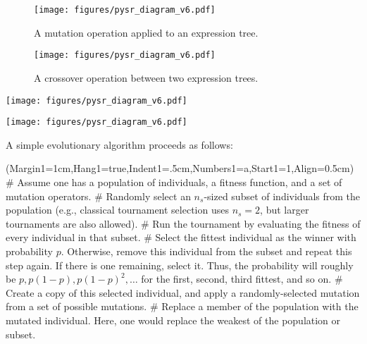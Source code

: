 \documentclass[letterpaper,twocolumn]{scrartcl}
\newcommand\pysr{\textsc{PySR}\xspace}
\begin{document}
\begin{figure}[h!]
    \centering
    \texttt{[image: figures/pysr\_diagram\_v6.pdf]}
    \caption{A mutation operation applied to an expression tree.}
    \label{fig:mutations}
\end{figure}

\begin{figure}[h!]
    \centering
    \texttt{[image: figures/pysr\_diagram\_v6.pdf]}
    \caption{A crossover operation between two expression trees.}
    \label{fig:crossover}
\end{figure}

\begin{figure*}[h!]
    \centering
    \texttt{[image: figures/pysr\_diagram\_v6.pdf]}
    \caption{The inner loop of \pysr. A population of expressions is randomly subsampled. Among this subsample, a tournament is performed, and the winner is selected for breeding: either by mutation, crossover, simplification, or explicit optimization. Examples of mutation and crossover operations are visualized in \cref{fig:mutations,fig:crossover}.}
    \label{fig:evolution_loop}
\end{figure*}

\begin{figure*}[h!]
    \centering
    \texttt{[image: figures/pysr\_diagram\_v6.pdf]}
    \caption{The outer loop of \pysr. Several populations evolve independently according to the algorithm described in \cref{fig:evolution_loop}. At the end of a specified number of rounds of evolution, migration between islands is performed.}
    \label{fig:migration}
\end{figure*}


A simple evolutionary algorithm proceeds as follows:
\begin{easylist}
\ListProperties(Margin1=1cm,Hang1=true,Indent1=.5cm,Numbers1=a,Start1=1,Align=0.5cm)
# Assume one has a population of individuals, a fitness function, and a set of mutation operators.
\label{step:assumptions}
# Randomly select an $n_s$-sized subset of individuals from the population (e.g., classical tournament selection uses $n_s=2$, but larger tournaments are also allowed).
\label{step:sampling}
# Run the tournament by evaluating the fitness of every individual in that subset.
\label{step:prep_tournament}
# Select the fittest individual as the winner with probability $p$. Otherwise, remove this individual from the subset and repeat this step again.
If there is one remaining, select it.
Thus, the probability will roughly be $p, p(1-p), p(1-p)^2, \ldots$ for the first, second, third fittest, and so on. 
\label{step:select}
# Create a copy of this selected individual, and apply a randomly-selected mutation from a set of possible mutations.
\label{step:mutate}
# Replace a member of the population with the mutated individual. Here, one would replace the weakest of the population or subset.
\label{step:replace}
\end{easylist}
\end{document}
